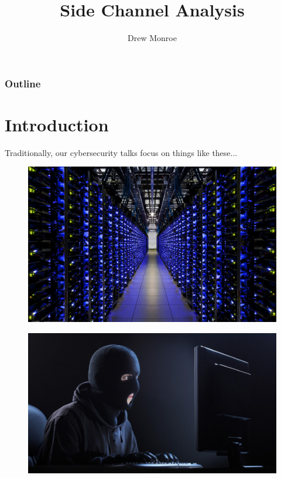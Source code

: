 \documentclass{beamer}
\title{Side Channel Analysis}
\author{Drew Monroe}
\begin{document}
\begin{frame}
\titlepage
\end{frame}

\begin{frame}
\frametitle{Outline}
\tableofcontents
\end{frame}

\section{Introduction}

\begin{frame}
    \begin{center}Traditionally, our cybersecurity talks focus on things like these...\end{center}
\end{frame}

\begin{frame}
\begin{figure}
  \centering
    \includegraphics[width=\linewidth,height=\textheight,keepaspectratio]{images/server-room.jpg}
    \cite{ServerRoom}
\end{figure}
\end{frame}

\begin{frame}
\begin{figure}
  \centering
    \includegraphics[width=\linewidth,height=\textheight,keepaspectratio]{images/phonesystemhackercreep.jpg}
    \cite{Hacker}
\end{figure}
\end{frame}
\end{document}

